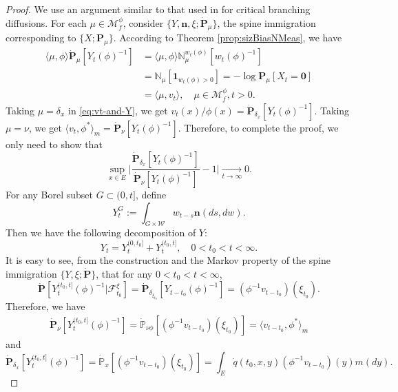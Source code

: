 \begin{proof}
	We use an argument similar to that used in \cite{Powell2015An-invariance} for critical branching diffusions.
	For each $\mu\in\mathcal M_f^\phi$, consider $\{Y, \mathbf n, \xi;\dot{\mathbf P}_\mu\}$, the spine immigration corresponding to $\{X;\mathbf P_\mu\}$.
	According to Theorem \ref{prop:sizBiasNMeas}, we have
\begin{equation}\label{eq:vt-and-Y}\begin{split}
	\langle \mu,\phi\rangle \dot {\mathbf P}_\mu [Y_t(\phi)^{-1}]
	&= \langle \mu,\phi\rangle \mathbb N_\mu^{w_t(\phi)} [ w_t(\phi)^{-1}] \\
	&= \mathbb N_{\mu}[\mathbf 1_{w_t(\phi)>0}]
	= -\log \mathbf P_{\mu} [ X_t = \mathbf 0] \\
	& = \langle \mu,v_t \rangle,\quad \mu\in\mathcal M_f^\phi,t > 0.
\end{split}\end{equation}
	Taking $\mu = \delta_x$ in \eqref{eq:vt-and-Y}, we get $v_t(x)/\phi(x)=\dot{\mathbf P}_{\delta_x}[Y_t(\phi)^{-1}]$.
	Taking $\mu = \nu$, we get $\langle v_t, \phi^*\rangle_m = \dot {\mathbf P}_{\nu} [Y_t(\phi)^{-1}]$.
	Therefore, to complete the proof, we only need to show that
\[
	\sup_{x\in E}\Big | \frac {\dot{\mathbf P}_{\delta_x}[Y_t(\phi)^{-1}]} {\dot {\mathbf P}_\nu [Y_t(\phi)^{-1}]}-1\Big|
	\xrightarrow[t\to\infty]{} 0.
\]
	For any Borel subset $G\subset (0,t]$, define
\[
	Y^G_t
	:= \int_{G\times \mathcal W} w_{t-s} \mathbf n(ds,dw).
\]
	Then we have the following decomposition of $Y$:
\begin{equation}\label{eq:decomposition-on-Y}
	Y_t
	= Y^{(0,t_0]}_t + Y^{(t_0,t]}_t,
	\quad 0 < t_0 < t < \infty.
\end{equation}
	It is easy to see, from the construction and the Markov property of the spine immigration $\{Y,\xi; \dot {\mathbf P}\}$, that for any $0 < t_0 < t < \infty$,
\[
	\dot{\mathbf P} [Y_t^{(t_0,t]}(\phi)^{-1}|\mathscr F^\xi_{t_0}]
	= \dot{\mathbf P}_{\delta_{\xi_{t_0}}}[Y_{t-t_0}(\phi)^{-1}]
	= (\phi^{-1}v_{t-t_0})(\xi_{t_0}).
\]
	Therefore, we have
\[\begin{split}
	\dot{\mathbf P}_\nu[Y_t^{(t_0,t]}(\phi)^{-1}]
	= \dot{\mathbb P}_{\nu\phi}[(\phi^{-1}v_{t-t_0})(\xi_{t_0}) ]
	= \langle v_{t-t_0},\phi^* \rangle_m
\end{split}\]
	and
\begin{equation}
\label{eq:Yt0t}
	\dot{\mathbf P}_{\delta_x}[Y_t^{(t_0,t]}(\phi)^{-1}]
	= \dot{\mathbb P}_x[(\phi^{-1}v_{t-t_0})(\xi_{t_0}) ]
	=  \int_E  \dot{q}(t_0,x,y)(\phi^{-1}v_{t-t_0})(y) m(dy).

\end{equation}
\end{proof}
